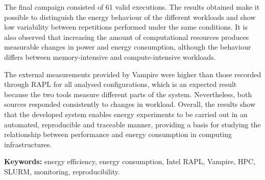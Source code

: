 The final campaign consisted of 61 valid executions. The results obtained make it possible to distinguish the energy behaviour of the different workloads and show low variability between repetitions performed under the same conditions. It is also observed that increasing the amount of computational resources produces measurable changes in power and energy consumption, although the behaviour differs between memory-intensive and compute-intensive workloads.

The external measurements provided by Vampire were higher than those recorded through RAPL for all analysed configurations, which is an expected result because the two tools measure different parts of the system. Nevertheless, both sources responded consistently to changes in workload. Overall, the results show that the developed system enables energy experiments to be carried out in an automated, reproducible and traceable manner, providing a basis for studying the relationship between performance and energy consumption in computing infrastructures.

\textbf{Keywords:} energy efficiency, energy consumption, Intel RAPL, Vampire, HPC, SLURM, monitoring, reproducibility.